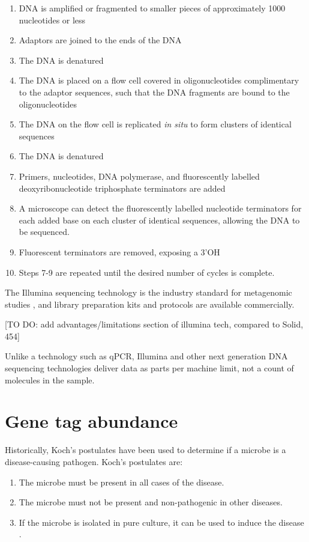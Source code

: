 \begin{enumerate}
\item DNA is amplified or fragmented to smaller pieces of approximately 1000 nucleotides or less
\item Adaptors are joined to the ends of the DNA
\item The DNA is denatured
\item The DNA is placed on a flow cell covered in oligonucleotides complimentary to the adaptor sequences, such that the DNA fragments are bound to the oligonucleotides
\item The DNA on the flow cell is replicated \textit{in situ} to form clusters of identical sequences
\item The DNA is denatured
\item Primers, nucleotides, DNA polymerase, and fluorescently labelled deoxyribonucleotide triphosphate terminators are added
\item A microscope can detect the fluorescently labelled nucleotide terminators for each added base on each cluster of identical sequences, allowing the DNA to be sequenced.
\item Fluorescent terminators are removed, exposing a 3'OH
\item Steps 7-9 are repeated until the desired number of cycles is complete.
\end{enumerate}

The Illumina sequencing technology is the industry standard for metagenomic studies \cite{bentley2008accurate}, and library preparation kits and protocols are available commercially.

[TO DO: add advantages/limitations section of illumina tech, compared to Solid, 454]

Unlike a technology such as qPCR, Illumina and other next generation DNA sequencing technologies deliver data as parts per machine limit, not a count of molecules in the sample.

\section{Gene tag abundance}
Historically, Koch’s postulates have been used to determine if a microbe is a disease-causing pathogen. Koch's postulates are:

\begin{enumerate}
\item The microbe must be present in all cases of the disease.
\item The microbe must not be present and non-pathogenic in other diseases.
\item If the microbe is isolated in pure culture, it can be used to induce the disease \cite{koch1891uber}.
\end{enumerate}

